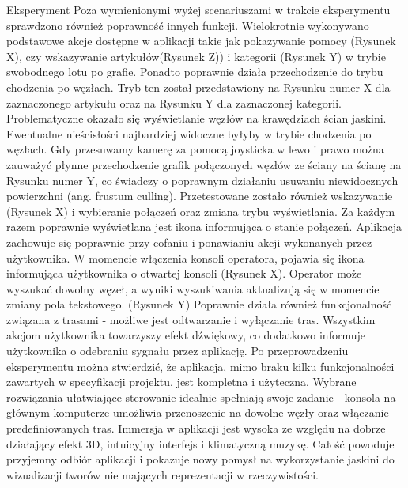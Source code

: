 \begin{chapter}{Eksperyment}
Poza wymienionymi wyżej scenariuszami w trakcie eksperymentu sprawdzono również poprawność innych funkcji. Wielokrotnie wykonywano podstawowe akcje dostępne w aplikacji takie jak pokazywanie pomocy (Rysunek X), czy wskazywanie artykułów(Rysunek Z))  i kategorii (Rysunek Y) w trybie swobodnego lotu po grafie. 
Ponadto poprawnie działa przechodzenie do trybu chodzenia po węzłach. Tryb ten został przedstawiony na Rysunku numer X dla zaznaczonego artykułu oraz na Rysunku Y dla zaznaczonej kategorii. Problematyczne okazało się wyświetlanie węzłów na krawędziach ścian jaskini. Ewentualne nieścisłości najbardziej widoczne byłyby w trybie chodzenia po węzłach. Gdy przesuwamy kamerę za pomocą joysticka w lewo i prawo można zauważyć płynne przechodzenie grafik połączonych węzłów ze ściany na ścianę na Rysunku numer Y, co świadczy o poprawnym działaniu usuwaniu niewidocznych powierzchni (ang. frustum culling). 
Przetestowane zostało również wskazywanie (Rysunek X) i wybieranie połączeń oraz zmiana trybu wyświetlania. Za każdym razem poprawnie wyświetlana jest ikona informująca o stanie połączeń. Aplikacja zachowuje się poprawnie przy cofaniu i ponawianiu akcji wykonanych przez użytkownika. W momencie włączenia konsoli operatora, pojawia się ikona informująca użytkownika o otwartej konsoli (Rysunek X). Operator może wyszukać dowolny węzeł, a wyniki wyszukiwania aktualizują się w momencie zmiany pola tekstowego. (Rysunek Y) Poprawnie działa również funkcjonalność związana z trasami - możliwe jest odtwarzanie i wyłączanie tras. Wszystkim akcjom użytkownika towarzyszy efekt dźwiękowy, co dodatkowo informuje użytkownika o odebraniu sygnału przez aplikację.
Po przeprowadzeniu eksperymentu można stwierdzić, że aplikacja, mimo braku kilku funkcjonalności zawartych w specyfikacji projektu, jest kompletna i użyteczna. Wybrane rozwiązania ułatwiające sterowanie idealnie spełniają swoje zadanie - konsola na głównym komputerze umożliwia przenoszenie na dowolne węzły oraz włączanie predefiniowanych tras.  Immersja w aplikacji jest wysoka ze względu na dobrze działający efekt 3D, intuicyjny interfejs i klimatyczną muzykę. Całość powoduje przyjemny odbiór aplikacji i pokazuje nowy pomysł na wykorzystanie jaskini do wizualizacji tworów nie mających reprezentacji w rzeczywistości. 

\end{chapter}

